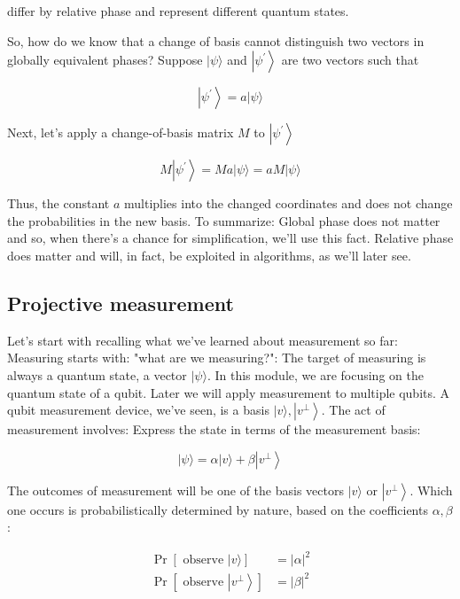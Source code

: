 \documentclass[main.tex]{subfiles}
\begin{document}
    differ by relative phase and represent different quantum states.
    
    So, how do we know that a change of basis cannot distinguish two vectors in globally equivalent phases? Suppose $|\psi\rangle$ and $\left|\psi^{\prime}\right\rangle$ are two vectors such that
    
    $$
    \left|\psi^{\prime}\right\rangle=a|\psi\rangle
    $$
    
    Next, let's apply a change-of-basis matrix $M$ to $\left|\psi^{\prime}\right\rangle$
    
    $$
    M\left|\psi^{\prime}\right\rangle=M a|\psi\rangle=a M|\psi\rangle
    $$
    
    Thus, the constant $a$ multiplies into the changed coordinates and does not change the probabilities in the new basis.
    To summarize: Global phase does not matter and so, when there's a chance for simplification, we'll use this fact. Relative phase does matter and will, in fact, be exploited in algorithms, as we'll later see.

\subsection{Projective measurement}

    Let's start with recalling what we've learned about measurement so far: Measuring starts with: "what are we measuring?": The target of measuring is always a quantum state, a vector $|\psi\rangle$. In this module, we are focusing on the quantum state of a qubit. Later we will apply measurement to multiple qubits. A qubit measurement device, we've seen, is a basis $|v\rangle,\left|v^{\perp}\right\rangle$. The act of measurement involves: Express the state in terms of the measurement basis:
    
    $$
    |\psi\rangle=\alpha|v\rangle+\beta\left|v^{\perp}\right\rangle
    $$
    
    The outcomes of measurement will be one of the basis vectors $|v\rangle$ or $\left|v^{\perp}\right\rangle$. Which one occurs is probabilistically determined by nature, based on the coefficients $\alpha, \beta$ :
    
    $$
    \begin{aligned}
    \operatorname{Pr}[\text { observe }|v\rangle] &=|\alpha|^{2} \\
    \operatorname{Pr}\left[\text { observe }\left|v^{\perp}\right\rangle\right] &=|\beta|^{2}
    \end{aligned}
    $$
    
\end{document}
